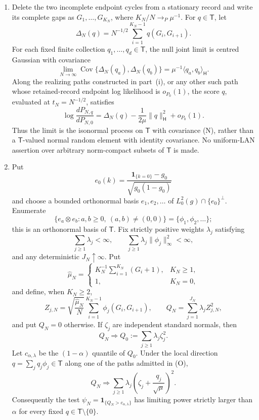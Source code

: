 \begin{theorem}
\begin{enumerate}[label=\textup{(\roman*)}]
\item Delete the two incomplete endpoint cycles from a stationary record and
write its complete gaps as $G_1,\ldots,G_{K_N}$, where
$K_N/N\to_P\mu^{-1}$.  For $q\in\mathsf T$, let
\[
 \Delta_N(q)=N^{-1/2}\sum_{i=1}^{K_N-1}q(G_i,G_{i+1}).
\]
For each fixed finite collection $q_1,\ldots,q_d\in\mathsf T$, the null
joint limit is centred Gaussian with covariance
\[
 \lim_{N\to\infty}\operatorname{Cov}
 \{\Delta_N(q_a),\Delta_N(q_b)\}
 =\mu^{-1}\langle q_a,q_b\rangle_{\mathsf H}.
 \tag{N}
\]
Along the realizing paths constructed in part~\textup{(i)}, or any other
such path whose retained-record endpoint log likelihood is $o_{P_0}(1)$,
the score $q$, evaluated at $t_N=N^{-1/2}$, satisfies
\[
 \log\frac{dP_{N,q}}{dP_{N,0}}
 =\Delta_N(q)-\frac1{2\mu}\|q\|_{\mathsf H}^2+o_{P_0}(1).
 \tag{O}
\]
Thus the limit is the isonormal process on $\mathsf T$ with covariance
\textup{(N)}, rather than a $\mathsf T$-valued normal random element with
identity covariance.  No uniform-LAN assertion over arbitrary norm-compact
subsets of $\mathsf T$ is made.

\item Put
\[
 e_0(k)=\frac{\mathbf1_{\{k=0\}}-g_0}{\sqrt{g_0(1-g_0)}}
\]
and choose a bounded orthonormal basis $e_1,e_2,\ldots$ of
$L^2_0(g)\cap\{e_0\}^{\perp}$.  Enumerate
\[
 \{e_a\otimes e_b:a,b\geq0,\ (a,b)\neq(0,0)\}
 =\{\phi_1,\phi_2,\ldots\};
\]
this is an orthonormal basis of $\mathsf T$.  Fix strictly positive weights
$\lambda_j$ satisfying
\[
 \sum_{j\geq1}\lambda_j<\infty,
 \qquad
 \sum_{j\geq1}\lambda_j\|\phi_j\|_\infty^2<\infty,
 \tag{P}
\]
and any deterministic $J_N\uparrow\infty$.  Put
\[
 \widehat\mu_N=
 \begin{cases}
 K_N^{-1}\sum_{i=1}^{K_N}(G_i+1),&K_N\geq1,\\
 1,&K_N=0,
 \end{cases}
\]
and define, when $K_N\geq2$,
\[
 Z_{j,N}=\sqrt{\frac{\widehat\mu_N}{N}}
 \sum_{i=1}^{K_N-1}\phi_j(G_i,G_{i+1}),\qquad
 Q_N=\sum_{j=1}^{J_N}\lambda_jZ_{j,N}^2,
 \tag{Q}
\]
and put $Q_N=0$ otherwise.  If $\zeta_j$ are independent standard normals,
then
\[
 Q_N\Rightarrow Q_0:=\sum_{j\geq1}\lambda_j\zeta_j^2.
 \tag{R}
\]
Let $c_{\alpha,\lambda}$ be the $(1-\alpha)$ quantile of $Q_0$.  Under the
local direction $q=\sum_jq_j\phi_j\in\mathsf T$ along one of the paths
admitted in \textup{(O)},
\[
 Q_N\Rightarrow
 \sum_{j\geq1}\lambda_j
 \left(\zeta_j+\frac{q_j}{\sqrt\mu}\right)^2.
 \tag{S}
\]
Consequently the test
$\psi_N=\mathbf1_{\{Q_N>c_{\alpha,\lambda}\}}$ has limiting power strictly
larger than $\alpha$ for every fixed $q\in\mathsf T\setminus\{0\}$.


\end{enumerate}
\end{theorem}
